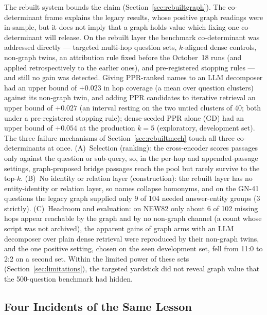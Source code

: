 The rebuilt system bounds the claim (Section~\ref{sec:rebuiltgraph}).
The co-determinant frame explains the legacy results, whose positive
graph readings were in-sample, but it does not imply that a graph holds
value which fixing one co-determinant will release. On the rebuilt layer
the benchmark co-determinant was addressed directly --- targeted
multi-hop question sets, $k$-aligned dense controls, non-graph twins, an attribution rule fixed before the October~18 runs (and applied retrospectively to the earlier ones), and pre-registered stopping
rules --- and still no gain was detected. Giving PPR-ranked names to an
LLM decomposer had an upper bound of $+0.023$ in hop coverage (a mean
over question clusters) against its non-graph twin, and adding PPR
candidates to iterative retrieval an upper bound of $+0.027$ (an interval resting on the two untied clusters of 40; both under
a pre-registered stopping rule); dense-seeded PPR alone (GD) had an
upper bound of $+0.054$ at the production $k=5$ (exploratory,
development set). The three failure mechanisms of Section~\ref{sec:rebuiltmech}
touch all three co-determinants at once. (A)~Selection (ranking): the
cross-encoder scores passages only against the question or sub-query,
so, in the per-hop and appended-passage settings, graph-proposed bridge
passages reach the pool but rarely survive to the top-$k$. (B)~No
identity or relation layer (construction): the rebuilt layer has no
entity-identity or relation layer, so names collapse homonyms, and on
the GN-41 questions the legacy graph supplied only 9 of 104 needed
answer-entity groups (3 strictly). (C)~Headroom and evaluation: on NEW82
only about 6 of 102 missing hops appear reachable by the graph and by no
non-graph channel (a count whose script was not archived), the apparent
gains of graph arms with an LLM decomposer over plain dense retrieval
were reproduced by their non-graph twins, and the one positive setting,
chosen on the seen development set, fell from 11:0 to 2:2 on a second
set. Within the limited power of these sets
(Section~\ref{sec:limitations}), the targeted yardstick did not reveal
graph value that the 500-question benchmark had hidden.

\subsection{Four Incidents of the Same Lesson}

